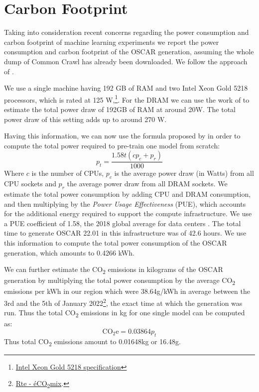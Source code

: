 \section{Carbon Footprint}\label{carbon_footprint_towards}

Taking into consideration recent concerns regarding the power consumption and carbon footprint of machine learning experiments \cite{schwartz-etal-2020-green,bender-etal-2021-on} we report the power consumption and carbon footprint of the OSCAR generation, assuming the whole dump of Common Crawl has already been downloaded. We follow the approach of .

We use a single machine having 192 GB of RAM and two Intel Xeon Gold 5218 processors, which is rated at 125 W,\footnote{\href{https://ark.intel.com/content/www/us/en/ark/products/192444/intel-xeon-gold-5218-processor-22m-cache-2-30-ghz.html}{Intel Xeon Gold 5218 specification}}. For the DRAM we can use the work of  to estimate the total power draw of 192GB of RAM at around 20W. The total power draw of this setting adds up to around 270 W.

Having this information, we can now use the formula proposed by  in order to compute the total power required to pre-train one model from scratch:
\[
    p_t = \frac{1.58t(cp_{c} + p_r)}{1000}
\]
Where $c$ is the number of CPUs, $p_c$ is the average power draw (in Watts) from all CPU sockets and $p_r$ the average power draw from all DRAM sockets. We estimate the total power consumption by adding CPU and DRAM consumption, and then multiplying by the \emph{Power Usage Effectiveness} (PUE), which accounts for the additional energy required to support the compute infrastructure. We use a PUE coefficient of 1.58, the 2018 global average for data centers \cite{strubell-etal-2019-energy}. The total time to generate OSCAR 22.01 in this infrastructure was of 42.6 hours. We use this information to compute the total power consumption of the OSCAR generation, which amounts to 0.4266 \unit{\kWh}.

We can further estimate the CO\textsubscript{2} emissions in kilograms of the OSCAR generation by multiplying the total power consumption by the average CO\textsubscript{2} emissions per \unit{\kWh} in our region which were 38.64\unit{\gram/\kWh} in average between the 3rd and the 5th of January 2022\footnote{\href{https://www.rte-france.com/eco2mix/les-emissions-de-co2-par-kwh-produit-en-france}{Rte - éCO\textsubscript{2}mix}.}, the exact time at which the generation was run. Thus the total CO\textsubscript{2} emissions in kg for one single model can be computed as:
\[
    \text{CO}_{2}\text{e} = 0.03864 p_t
\]
Thus total CO\textsubscript{2} emissions amount to 0.01648\unit{\kilo\gram} or 16.48\unit{\gram}.

